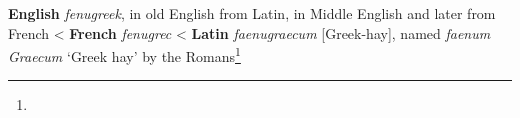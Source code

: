 \begin{etymology}\label{ety:fenugreek}
\textbf{English} \textit{fenugreek}, in old English from Latin, in Middle English and later from French
< \textbf{French} \textit{fenugrec}
< \textbf{Latin} \textit{faenugraecum} [Greek-hay], named \textit{faenum Graecum} `Greek hay' by the Romans\footnote{}
\end{etymology}